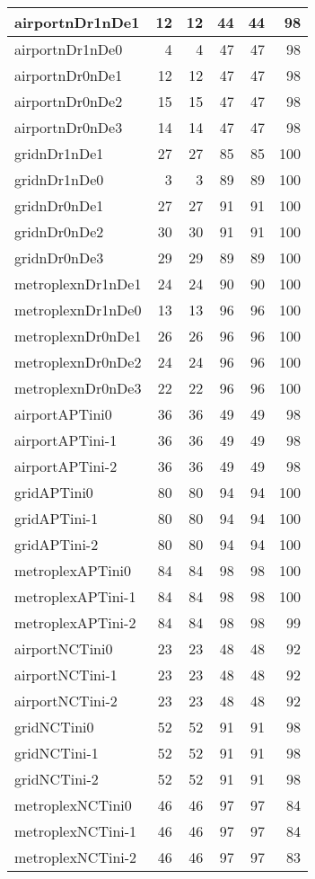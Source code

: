 \begin{longtable}{|l|r|r|r|r|r|}
\endlastfoot
airportnDr1nDe1 & 12 & 12 & 44 & 44 & 98 \\ \hline
airportnDr1nDe0 & 4 & 4 & 47 & 47 & 98 \\ \hline
airportnDr0nDe1 & 12 & 12 & 47 & 47 & 98 \\ \hline
airportnDr0nDe2 & 15 & 15 & 47 & 47 & 98 \\ \hline
airportnDr0nDe3 & 14 & 14 & 47 & 47 & 98 \\ \hline
gridnDr1nDe1 & 27 & 27 & 85 & 85 & 100 \\ \hline
gridnDr1nDe0 & 3 & 3 & 89 & 89 & 100 \\ \hline
gridnDr0nDe1 & 27 & 27 & 91 & 91 & 100 \\ \hline
gridnDr0nDe2 & 30 & 30 & 91 & 91 & 100 \\ \hline
gridnDr0nDe3 & 29 & 29 & 89 & 89 & 100 \\ \hline
metroplexnDr1nDe1 & 24 & 24 & 90 & 90 & 100 \\ \hline
metroplexnDr1nDe0 & 13 & 13 & 96 & 96 & 100 \\ \hline
metroplexnDr0nDe1 & 26 & 26 & 96 & 96 & 100 \\ \hline
metroplexnDr0nDe2 & 24 & 24 & 96 & 96 & 100 \\ \hline
metroplexnDr0nDe3 & 22 & 22 & 96 & 96 & 100 \\ \hline
airportAPTini0 & 36 & 36 & 49 & 49 & 98 \\ \hline
airportAPTini-1 & 36 & 36 & 49 & 49 & 98 \\ \hline
airportAPTini-2 & 36 & 36 & 49 & 49 & 98 \\ \hline
gridAPTini0 & 80 & 80 & 94 & 94 & 100 \\ \hline
gridAPTini-1 & 80 & 80 & 94 & 94 & 100 \\ \hline
gridAPTini-2 & 80 & 80 & 94 & 94 & 100 \\ \hline
metroplexAPTini0 & 84 & 84 & 98 & 98 & 100 \\ \hline
metroplexAPTini-1 & 84 & 84 & 98 & 98 & 100 \\ \hline
metroplexAPTini-2 & 84 & 84 & 98 & 98 & 99 \\ \hline
airportNCTini0 & 23 & 23 & 48 & 48 & 92 \\ \hline
airportNCTini-1 & 23 & 23 & 48 & 48 & 92 \\ \hline
airportNCTini-2 & 23 & 23 & 48 & 48 & 92 \\ \hline
gridNCTini0 & 52 & 52 & 91 & 91 & 98 \\ \hline
gridNCTini-1 & 52 & 52 & 91 & 91 & 98 \\ \hline
gridNCTini-2 & 52 & 52 & 91 & 91 & 98 \\ \hline
metroplexNCTini0 & 46 & 46 & 97 & 97 & 84 \\ \hline
metroplexNCTini-1 & 46 & 46 & 97 & 97 & 84 \\ \hline
metroplexNCTini-2 & 46 & 46 & 97 & 97 & 83 \\ \hline
\end{longtable}
